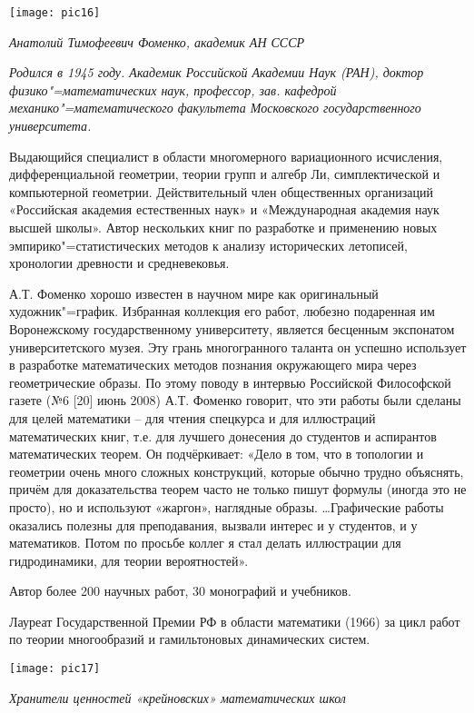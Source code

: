 \begin{center}

\texttt{[image: pic16]}


{\it Анатолий Тимофеевич Фоменко, академик АН СССР}
\end{center}

{\it Родился в 1945 году. Академик Российской Академии Наук (РАН), доктор физико"=математических наук, профессор, зав. кафедрой механико"=математического факультета Московского государственного университета.

Выдающийся специалист в области многомерного вариационного исчисления, дифференциальной геометрии, теории групп и алгебр Ли, симплектической и компьютерной геометрии. Действительный член общественных организаций «Российская академия естественных наук» и «Международная академия наук высшей школы». Автор нескольких книг по разработке и применению новых эмпирико"=статистических методов к анализу исторических летописей, хронологии древности и средневековья.

А.Т. Фоменко хорошо известен в научном мире как оригинальный художник"=график. Избранная коллекция его работ, любезно подаренная им Воронежскому государственному университету, является бесценным экспонатом университетского музея. Эту грань многогранного таланта он успешно использует в разработке математических методов познания окружающего мира через геометрические образы. По этому поводу в интервью Российской Философской газете (№6 [20] июнь 2008) А.Т. Фоменко говорит, что эти работы были сделаны для целей математики – для чтения спецкурса и для иллюстраций математических книг, т.е. для лучшего донесения до студентов и аспирантов математических теорем.  Он подчёркивает: «Дело в том, что в топологии и геометрии очень много сложных конструкций, которые обычно трудно объяснять, причём для доказательства теорем часто не только пишут формулы (иногда это не просто), но и используют «жаргон», наглядные образы. …Графические работы оказались полезны для преподавания, вызвали интерес и у студентов, и у математиков. Потом по просьбе коллег я стал делать иллюстрации для гидродинамики, для теории вероятностей».

Автор более 200 научных работ, 30 монографий и учебников.

Лауреат Государственной Премии РФ в области математики (1966) за цикл работ по теории многообразий и гамильтоновых динамических систем.}


\begin{center}

\texttt{[image: pic17]}


{\it Хранители ценностей
«крейновских» математических школ
}
\end{center}

